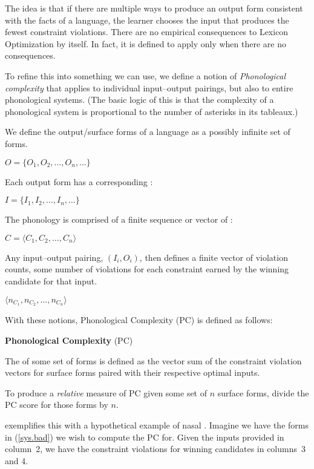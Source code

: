 \documentclass[output=paper,
modfonts
]{LSP/langsci}
\begin{document}
\noindent The idea is that if there are multiple ways to produce an output form consistent with the facts of a language, the learner chooses the input that produces the fewest constraint violations. There are no empirical consequences to Lexicon Optimization by itself. In fact, it is defined to apply only when there are no consequences.

To refine this into something we can use, we define a notion of \emph{Phonological complexity} that applies to individual input--output pairings, but also to entire phonological systems. (The basic logic of this is that the complexity of a phonological system is proportional to the number of asterisks in its tableaux.)

We define the output/surface forms of a language as a possibly infinite set of forms.

\ea
$O = \{O_1, O_2, \ldots, O_n, \ldots\}$
\z

\noindent Each output form has a corresponding :

\ea
$I = \{I_1, I_2, \ldots, I_n, \ldots\}$
\z

\noindent The phonology is comprised of a finite sequence or vector of :

\ea
$C = \langle C_1, C_2, \ldots, C_n\rangle$
\z

\noindent Any input--output pairing, $(I_i,O_i)$, then defines a finite vector of violation counts, some number of violations for each constraint earned by the winning candidate for that input.

\ea
$\langle n_{C_1}, n_{C_2}, \ldots, n_{C_n}\rangle$
\z

With these notions, Phonological Complexity (PC) is defined as follows:

\ea
\label{pc}
\textbf{Phonological Complexity} (PC)

The  of some set of forms is defined as the vector sum of the constraint violation vectors for surface forms paired with their respective  optimal inputs.

\vspace{.1in}

To produce a \emph{relative} measure of PC given some set of $n$ surface forms, divide the PC score for those forms by $n$.
\z

\citet{inopt.phon} exemplifies this with a hypothetical example of nasal . Imagine we have the forms in (\ref{sys.bad}) we wish to compute the PC for. Given the inputs provided in column~2, we have the constraint violations for winning candidates in columns~3 and 4. 
\end{document}
